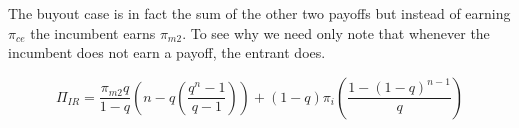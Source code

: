 \documentclass[11pt]{article}
\begin{document}
The buyout case is in fact the sum of the other two payoffs but instead of earning $\pi_{ce}$ the incumbent earns $\pi_{m2}$. To see why we need only note that whenever the incumbent does not earn a payoff, the entrant does. 

\begin{equation*}
\Pi_{IR} = \frac{\pi_{m2} q}{1-q} \left(n-q (\frac{q^n-1}{q-1}) \right)
+(1-q)\pi_i \left(\frac{1-(1-q)^{n-1}}{q} \right)
\end{equation*}

\newpage



\end{document}
